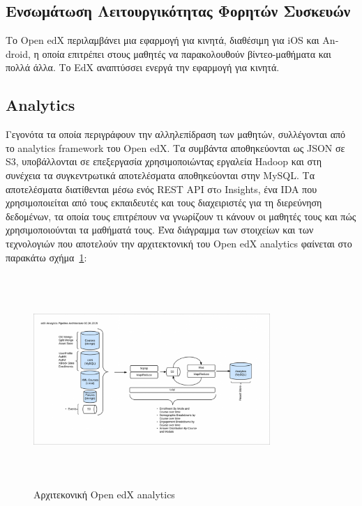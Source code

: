 \documentclass[12pt]{report}
\begin{document}
\subsection{Ενσωμάτωση Λειτουργικότητας Φορητών Συσκευών} Το \textlatin{Open edX} περιλαμβάνει μια εφαρμογή για κινητά, διαθέσιμη για \textlatin{iOS} και \textlatin{Android}, η οποία επιτρέπει στους μαθητές να παρακολουθούν βίντεο-μαθήματα και πολλά άλλα. Το \textlatin{EdX} αναπτύσσει ενεργά την εφαρμογή για κινητά.

\subsection{\textlatin{Analytics}}
Γεγονότα τα οποία περιγράφουν την αλληλεπίδραση των μαθητών, συλλέγονται από το \textlatin{analytics framework} του \textlatin{Open edX}. Τα συμβάντα αποθηκεύονται ως \textlatin{JSON} σε \textlatin{S3}, υποβάλλονται σε επεξεργασία χρησιμοποιώντας εργαλεία \textlatin{Hadoop} και στη συνέχεια τα συγκεντρωτικά αποτελέσματα αποθηκεύονται στην \textlatin{MySQL}. Τα αποτελέσματα διατίθενται μέσω ενός \textlatin{REST API} στo \textlatin{Insights}, ένα \textlatin{IDA} που χρησιμοποιείται από τους εκπαιδευτές και τους διαχειριστές για τη διερεύνηση δεδομένων, τα οποία τους επιτρέπουν να γνωρίζουν τι κάνουν οι μαθητές τους και πώς χρησιμοποιούνται τα μαθήματά τους. Ένα διάγραμμα των στοιχείων και των τεχνολογιών που αποτελούν την αρχιτεκτονική του \textlatin{Open edX analytics} φαίνεται στο παρακάτω σχήμα~\ref{fig:edx_analytics_arch}:
\begin{figure}[!htbp]
\centering
\includegraphics[width=0.8\textwidth, height=8cm]{edx-architecture-analytics}
\caption{Αρχιτεκονική \textlatin{Open edX analytics}}
\label{fig:edx_analytics_arch}
\end{figure}
\end{document}
